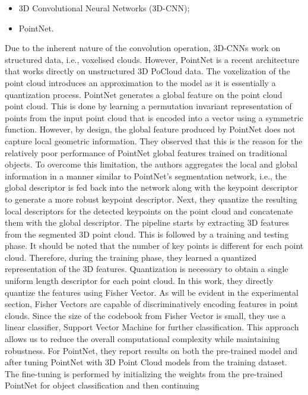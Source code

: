 \begin{itemize}
\item 3D Convolutional Neural Networks (3D-CNN);
\item PointNet.
\end{itemize}

Due to the inherent nature of the convolution operation, 3D-CNNs work on structured data, i.e., voxelised clouds. However, PointNet is a recent architecture that works
directly on unstructured 3D PoCloud data. The voxelization of the point cloud introduces an approximation to the model as it is essentially a quantization process. PointNet
generates a global feature on the point cloud point cloud. This is done by learning a permutation invariant representation of points from the input point cloud that is
encoded into a vector using a symmetric function.  However, by design, the global feature produced by PointNet does not capture local geometric information. They observed
that this is the reason for the relatively poor performance of PointNet global features trained on traditional objects. To overcome this limitation, the authors aggregates the
local and global information in a manner similar to PointNet's segmentation network, i.e., the global descriptor is fed back into the network along with the keypoint
descriptor to generate a more robust keypoint descriptor. Next, they quantize the resulting local descriptors for the detected keypoints on the point cloud and concatenate
them with the global descriptor. The pipeline starts by extracting 3D features from the segmented 3D point cloud. This is followed by a training and testing phase.
It should be noted that the number of key points is different for each point cloud. Therefore, during the training phase, they learned a quantized representation of
the 3D features. Quantization is necessary to obtain a single uniform length descriptor for each point cloud.  In this work, they directly quantize the features using
Fisher Vector. As will be evident in the experimental section, Fisher Vectors are capable of discriminatively encoding features in point clouds. Since the size of the
codebook from Fisher Vector is small, they use a linear classifier, Support Vector Machine for further classification. This approach allows us to reduce the overall
computational complexity while maintaining robustness. For PointNet, they report results on both the pre-trained model and after tuning PointNet with 3D Point Cloud
models from the training dataset. The fine-tuning is performed by initializing the weights from the pre-trained PointNet for object classification and then continuing
